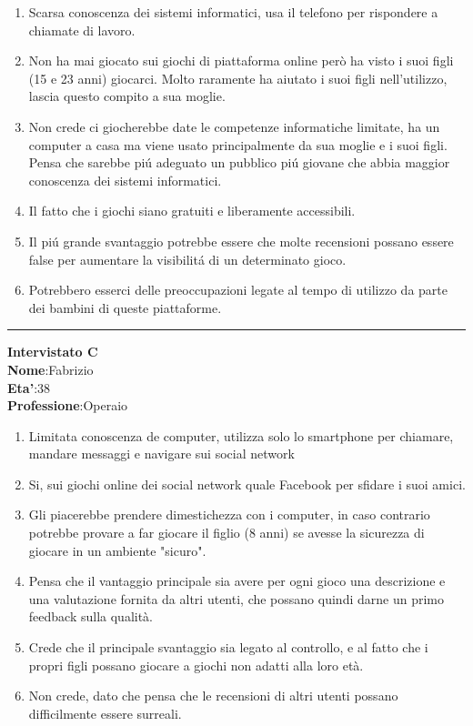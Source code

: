 \documentclass[../Report.tex]{subfiles}
\begin{document}
    \begin{enumerate}
        \item Scarsa conoscenza dei sistemi informatici, usa il telefono per rispondere a chiamate di lavoro.
        \item Non ha mai giocato sui giochi di piattaforma online però ha visto i suoi figli (15 e 23 anni) giocarci. Molto raramente ha aiutato i suoi figli nell'utilizzo, lascia questo compito a sua moglie. 
        \item Non crede ci giocherebbe date le competenze informatiche limitate, ha un computer a casa ma viene usato principalmente da sua moglie e i suoi figli. \\Pensa che sarebbe piú adeguato un pubblico piú giovane che abbia maggior conoscenza dei sistemi informatici.
        \item Il fatto che i giochi siano gratuiti e liberamente accessibili. 
        \item Il piú grande svantaggio potrebbe essere che molte recensioni possano essere false per aumentare la visibilitá di un determinato gioco.
        \item Potrebbero esserci delle preoccupazioni legate al tempo di utilizzo da parte dei bambini di queste piattaforme.  
        
    \end{enumerate}
    \hrule
    \textbf{Intervistato C}\\
    
    \textbf{Nome}:Fabrizio\\
    \textbf{Eta'}:38\\
    \textbf{Professione}:Operaio

    \begin{enumerate}
        \item Limitata conoscenza de computer, utilizza solo lo smartphone per chiamare, mandare messaggi e navigare sui social network
        \item Si, sui giochi online dei social network quale Facebook per sfidare i suoi amici. 
        \item Gli piacerebbe prendere dimestichezza con i computer, in caso contrario potrebbe provare a far giocare il figlio (8 anni) se avesse la sicurezza di giocare in un ambiente "sicuro".
        \item Pensa che il vantaggio principale sia avere per ogni gioco una descrizione e una valutazione fornita da altri utenti, che possano quindi darne un primo feedback sulla qualità. 
        \item Crede che il principale svantaggio sia legato al controllo, e al fatto che i propri figli possano giocare a giochi non adatti alla loro età.
        \item Non crede, dato che pensa che le recensioni di altri utenti possano difficilmente essere surreali.
    \end{enumerate}
\end{document}
